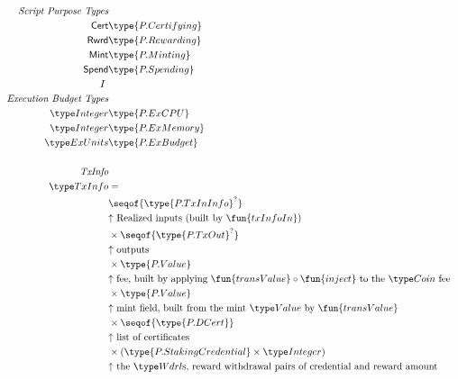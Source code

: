 \begin{figure*}[htb]
  \begin{align*}
    \emph{Script Purpose Types} \\
    \mathsf{Cert}  & \type{P.Certifying} \\
    \mathsf{Rwrd} & \type{P.Rewarding} \\
    \mathsf{Mint} & \type{P.Minting} \\
    \mathsf{Spend} & \type{P.Spending} \\I
    ~\\
    \emph{Execution Budget Types} \\
    \Integer & \type{P.ExCPU} \\
    \Integer  & \type{P.ExMemory}\\
    \ExUnits & \type{P.ExBudget}  \\
    ~\\
    \emph{TxInfo} \\
    \TxInfo &= \\
      & \seqof{ \type{P.TxInInfo}^? } \\ %
      & \text{$\uparrow$ Realized inputs (built by $\fun{txInfoIn}$)} \\
      & \times \seqof {\type{P.TxOut}^?}  \\
      & \text{$\uparrow$ outputs} \\ %
      & \times \type{P.Value} \\
      & \text{$\uparrow$ fee, built by applying $\fun{transValue}\circ\fun{inject}$ to the $\Coin$ fee} \\ %
      & \times \type{P.Value}  \\
      & \text{$\uparrow$ mint field, built from the mint $\Value$ by $\fun{transValue}$} \\ %
      & \times \seqof{\type{P.DCert}}  \\
      & \text{$\uparrow$ list of certificates} \\ %
      & \times (\type{P.StakingCredential} \times \Integer) \\
      & \text{$\uparrow$ the $\Wdrl$s, reward withdrawal pairs of credential and reward amount} \\ %

\end{align*}
\end{figure*}
